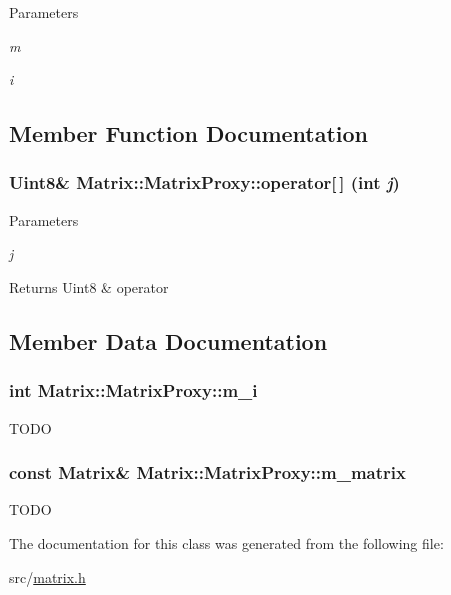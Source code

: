 \begin{DoxyParams}{Parameters}
\item[{\em m}]\item[{\em i}]\end{DoxyParams}


\subsection{Member Function Documentation}
\hypertarget{classMatrix_1_1MatrixProxy_a2ed980ec3430586562e32af3151ad82b}{
\subsubsection[{operator[]}]{\setlength{\rightskip}{0pt plus 5cm}Uint8\& Matrix::MatrixProxy::operator\mbox{[}$\,$\mbox{]} (int {\em j})}}
\label{classMatrix_1_1MatrixProxy_a2ed980ec3430586562e32af3151ad82b}

\begin{DoxyParams}{Parameters}
\item[{\em j}]\end{DoxyParams}
\begin{DoxyReturn}{Returns}
Uint8 \& operator 
\end{DoxyReturn}


\subsection{Member Data Documentation}
\hypertarget{classMatrix_1_1MatrixProxy_ab9582d03e8e1bbb6f03473691f01330f}{
\subsubsection[{m\_\-i}]{\setlength{\rightskip}{0pt plus 5cm}int {\bf Matrix::MatrixProxy::m\_\-i}}}
\label{classMatrix_1_1MatrixProxy_ab9582d03e8e1bbb6f03473691f01330f}
TODO \hypertarget{classMatrix_1_1MatrixProxy_a39060e70408df9c6b279340decf6f2c7}{
\subsubsection[{m\_\-matrix}]{\setlength{\rightskip}{0pt plus 5cm}const {\bf Matrix}\& {\bf Matrix::MatrixProxy::m\_\-matrix}}}
\label{classMatrix_1_1MatrixProxy_a39060e70408df9c6b279340decf6f2c7}
TODO 

The documentation for this class was generated from the following file:\begin{DoxyCompactItemize}
\item 
src/\hyperlink{matrix_8h}{matrix.h}\end{DoxyCompactItemize}
